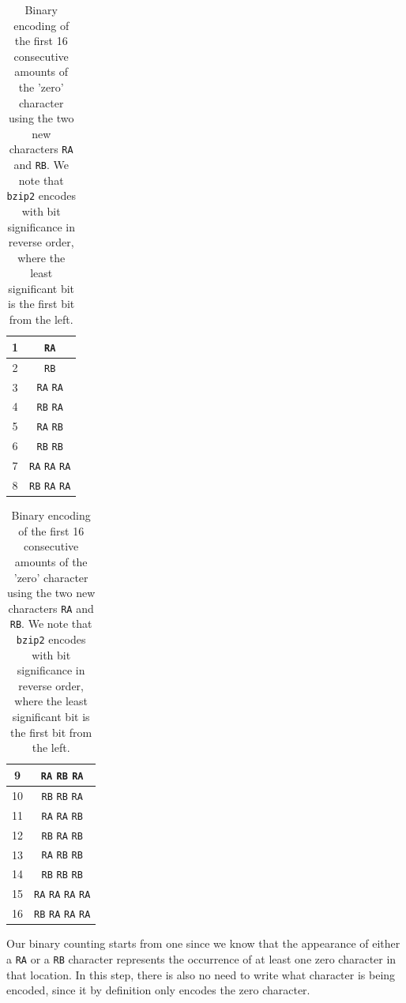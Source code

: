 \documentclass{article}
\begin{document}
\begin{table}[H]
    \centering
    \begin{tabular}{|c|c|}
        \hline
        1 & \texttt{RA} \\ \hline
        2 & \texttt{RB} \\ \hline
        3 & \texttt{RA} \texttt{RA} \\ \hline
        4 & \texttt{RB} \texttt{RA} \\ \hline
        5 & \texttt{RA} \texttt{RB} \\ \hline
        6 & \texttt{RB} \texttt{RB} \\ \hline
        7 & \texttt{RA} \texttt{RA} \texttt{RA} \\ \hline
        8 & \texttt{RB} \texttt{RA} \texttt{RA} \\ \hline
    \end{tabular}
    \quad
    \begin{tabular}{|c|c|}
        \hline
        9 & \texttt{RA} \texttt{RB} \texttt{RA} \\ \hline
        10 & \texttt{RB} \texttt{RB} \texttt{RA} \\ \hline
        11 & \texttt{RA} \texttt{RA} \texttt{RB} \\ \hline
        12 & \texttt{RB} \texttt{RA} \texttt{RB} \\ \hline
        13 & \texttt{RA} \texttt{RB} \texttt{RB} \\ \hline
        14 & \texttt{RB} \texttt{RB} \texttt{RB} \\ \hline
        15 & \texttt{RA} \texttt{RA} \texttt{RA} \texttt{RA} \\ \hline
        16 & \texttt{RB} \texttt{RA} \texttt{RA} \texttt{RA} \\ \hline
    \end{tabular}
    \caption{Binary encoding of the first 16 consecutive amounts of the 'zero' character using the two new characters \texttt{RA} and \texttt{RB}. We note that \texttt{bzip2} encodes with bit significance in reverse order, where the least significant bit is the first bit from the left.}
    \label{tab:my_label}
\end{table}
Our binary counting starts from one since we know that the appearance of either a \texttt{RA} or a \texttt{RB} character represents the occurrence of at least one zero character in that location. In this step, there is also no need to write what character is being encoded, since it by definition only encodes the zero character.
\end{document}
